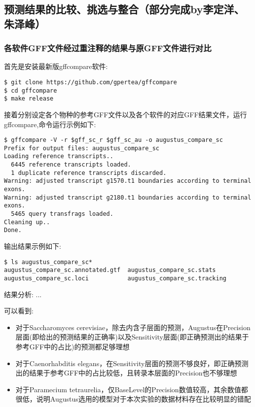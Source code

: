 \documentclass[12pt]{ctexart}
\begin{document}
\subsection{预测结果的比较、挑选与整合（部分完成by李定洋、朱泽峰）}

\subsubsection{各软件GFF文件经过重注释的结果与原GFF文件进行对比}

首先是安装最新版gffcompare软件:

\begin{lstlisting}
$ git clone https://github.com/gpertea/gffcompare
$ cd gffcompare
$ make release
\end{lstlisting}

接着分别设定各个物种的参考GFF文件以及各个软件的对应GFF结果文件，运行gffcompare,命令运行示例如下:


\begin{lstlisting}
$ gffcompare -V -r $gff_sc_r $gff_sc_au -o augustus_compare_sc
Prefix for output files: augustus_compare_sc
Loading reference transcripts..
  6445 reference transcripts loaded.
  1 duplicate reference transcripts discarded.
Warning: adjusted transcript g1570.t1 boundaries according to terminal exons.
Warning: adjusted transcript g2180.t1 boundaries according to terminal exons.
  5465 query transfrags loaded.
Cleaning up..
Done.
\end{lstlisting}

输出结果示例如下:

\begin{lstlisting}
$ ls augustus_compare_sc*
augustus_compare_sc.annotated.gtf  augustus_compare_sc.stats
augustus_compare_sc.loci           augustus_compare_sc.tracking
\end{lstlisting}

结果分析: ...


可以看到:

\begin{itemize}
    \item 对于Saccharomyces cerevisiae，除去内含子层面的预测，Augustus在Precision层面(即给出的预测结果的正确率)以及Sensitivity层面(即正确预测出的结果于参考GFF中的占比)的预测都足够理想
    \item 对于Caenorhabditis elegans，在Sensitivity层面的预测不够良好，即正确预测出的结果于参考GFF中的占比较低，且转录本层面的Precision也不够理想
    \item 对于Paramecium tetraurelia，仅BaseLevel的Precision数值较高，其余数值都很低，说明Augustus选用的模型对于本次实验的数据材料存在比较明显的错配
\end{itemize}
\end{document}
